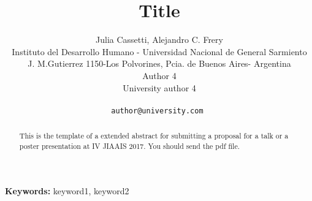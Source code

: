 \documentclass[a4paper]{article} %
\date{} %
\def\keywords#1{{\bf Keywords: }{#1}}
\begin{document}
\thispagestyle{empty}

\title{\textbf{Title}}

\author{Julia Cassetti, Alejandro C. Frery\\ %
	Instituto del Desarrollo Humano -  Universidad Nacional de General Sarmiento \\
	J. M.Gutierrez 1150-Los Polvorines, Pcia. de Buenos Aires- Argentina \\ %
	Author 4 \\ %
	University author 4 \\ \\ %
	\tt{author@university.com} %
}%

\date{} %
\maketitle\thispagestyle{empty} %


\begin{abstract}
This is the template of a extended abstract for submitting a proposal for a talk or a poster presentation at IV JIAAIS 2017. You should send the pdf file.


\end{abstract}

\keywords{keyword1, keyword2}
\end{document}
